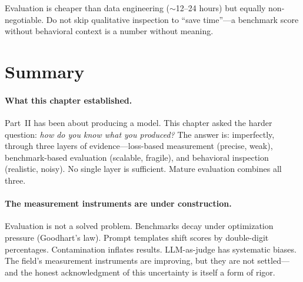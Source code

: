 Evaluation is cheaper than data engineering ($\sim$12--24 hours) but equally non-negotiable. Do not skip qualitative inspection to ``save time''---a benchmark score without behavioral context is a number without meaning.

\noindent{}


\section*{Summary}

\paragraph{What this chapter established.} Part~II has been about producing a model. This chapter asked the harder question: \emph{how do you know what you produced?} The answer is: imperfectly, through three layers of evidence---loss-based measurement (precise, weak), benchmark-based evaluation (scalable, fragile), and behavioral inspection (realistic, noisy). No single layer is sufficient. Mature evaluation combines all three.

\paragraph{The measurement instruments are under construction.} Evaluation is not a solved problem. Benchmarks decay under optimization pressure (Goodhart's law). Prompt templates shift scores by double-digit percentages. Contamination inflates results. LLM-as-judge has systematic biases. The field's measurement instruments are improving, but they are not settled---and the honest acknowledgment of this uncertainty is itself a form of rigor.

